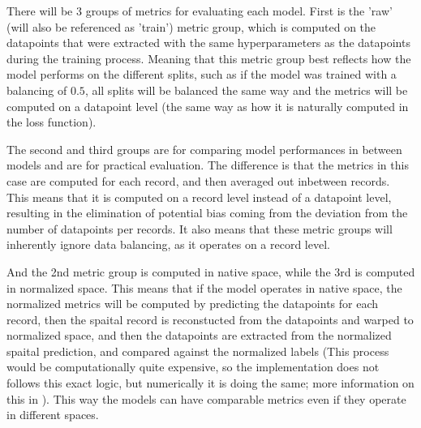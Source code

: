There will be 3 groups of metrics for evaluating each model. First is the 'raw' (will also be referenced as 'train') metric group, which is computed on the datapoints that were extracted with the same hyperparameters as the datapoints during the training process. Meaning that this metric group best reflects how the model performs on the different splits, such as if the model was trained with a balancing of $0.5$, all splits will be balanced the same way and the metrics will be computed on a datapoint level (the same way as how it is naturally computed in the loss function).\par
The second and third groups are for comparing model performances in between models and are for practical evaluation. The difference is that the metrics in this case are computed for each record, and then averaged out inbetween records. This means that it is computed on a record level instead of a datapoint level, resulting in the elimination of potential bias coming from the deviation from the number of datapoints per records. It also means that these metric groups will inherently ignore data balancing, as it operates on a record level.\par
And the 2nd metric group is computed in native space, while the 3rd is computed in normalized space. This means that if the model operates in native space, the normalized metrics will be computed by predicting the datapoints for each record, then the spaital record is reconstucted from the datapoints and warped to normalized space, and then the datapoints are extracted from the normalized spaital prediction, and compared against the normalized labels (This process would be computationally quite expensive, so the implementation does not follows this exact logic, but numerically it is doing the same; more information on this in ). This way the models can have comparable metrics even if they operate in different spaces.











